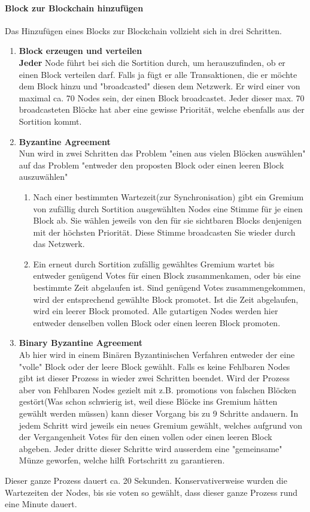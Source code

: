 \documentclass[11pt,a4paper]{article}
\begin{document}
\paragraph*{Block zur Blockchain hinzuf\"ugen }
Das Hinzuf\"ugen eines Blocks zur Blockchain vollzieht sich in drei Schritten.
\begin{enumerate}[label=\arabic*)]
	\item \textbf{Block erzeugen und verteilen}\\
	\textbf{Jeder} Node f\"uhrt bei sich die Sortition durch, um herauszufinden, ob er einen Block verteilen darf. Falls ja f\"ugt er alle Transaktionen, die er m\"ochte dem Block hinzu und "broadcasted" diesen dem Netzwerk. Er wird einer von maximal ca. 70 Nodes sein, der einen Block broadcastet. Jeder dieser max. 70 broadcasteten Blöcke hat aber eine gewisse Priorität, welche ebenfalls aus der Sortition kommt. 
	\item \textbf{Byzantine Agreement}\\
	Nun wird in zwei Schritten das Problem "einen aus vielen Blöcken auswählen" auf das Problem "entweder den proposten Block oder einen leeren Block auszuwählen"
	\begin{enumerate}[label=\Roman*)]
		\item Nach einer bestimmten Wartezeit(zur Synchronisation) gibt ein Gremium von zufällig durch Sortition ausgewählten Nodes eine Stimme für je einen Block ab. Sie wählen jeweils von den für sie sichtbaren Blocks denjenigen mit der höchsten Priorität. Diese Stimme broadcasten Sie wieder durch das Netzwerk.
		\item Ein erneut durch Sortition zufällig gewähltes Gremium wartet bis entweder genügend Votes für einen Block zusammenkamen, oder bis eine bestimmte Zeit abgelaufen ist. 
		Sind genügend Votes zusammengekommen, wird der entsprechend gewählte Block promotet.
		Ist die Zeit abgelaufen, wird ein leerer Block promoted. 
		Alle gutartigen Nodes werden hier entweder denselben vollen Block oder einen leeren Block promoten. 
	\end{enumerate}
	\item \textbf{Binary Byzantine Agreement}\\
	Ab hier wird in einem Binären Byzantinischen Verfahren entweder der eine "volle" Block oder der leere Block gewählt. Falls es keine Fehlbaren Nodes gibt ist dieser Prozess in wieder zwei Schritten beendet. Wird der Prozess aber von Fehlbaren Nodes gezielt mit z.B. promotions von falschen Blöcken gestört(Was schon schwierig ist, weil diese Blöcke ins Gremium hätten gewählt werden müssen) kann dieser Vorgang bis zu 9 Schritte andauern.
	In jedem Schritt wird jeweils ein neues Gremium gewählt, welches aufgrund von der Vergangenheit Votes für den einen vollen oder einen leeren Block abgeben. Jeder dritte dieser Schritte wird ausserdem eine "gemeinsame" Münze geworfen, welche hilft Fortschritt zu garantieren. 
\end{enumerate}
Dieser ganze Prozess dauert ca. 20 Sekunden. Konservativerweise wurden die Wartezeiten der Nodes, bis sie voten so gewählt, dass dieser ganze Prozess rund eine Minute dauert.
\end{document}
